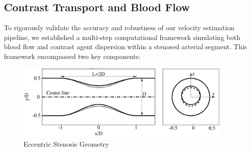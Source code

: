 \documentclass[times,twocolumn,final]{elsarticle}
\begin{document}
\subsection{Contrast Transport and Blood Flow}
To rigorously validate the accuracy and robustness of our velocity estimation pipeline, we established a multi-step computational framework simulating both blood flow and contrast agent dispersion within a stenosed arterial segment. This framework encompassed two key components:
\begin{figure}[!t]
    \centering
    \includegraphics[width=0.95\textwidth]{./Figures/Figure1_StenosisModel.png}
    \caption{Eccentric Stenosis Geometry}
    \label{Figure:stenosed_geometry}
    \end{figure}
\end{document}

